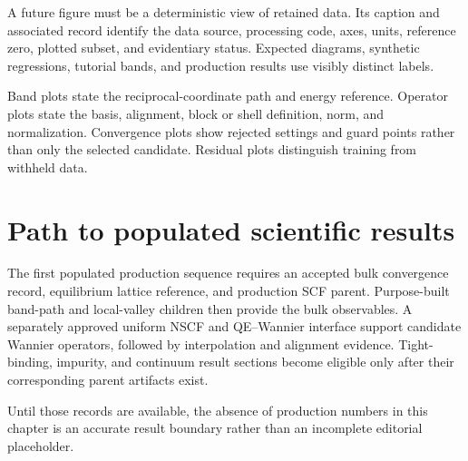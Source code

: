 A future figure must be a deterministic view of retained data. Its caption and
associated record identify the data source, processing code, axes, units,
reference zero, plotted subset, and evidentiary status. Expected diagrams,
synthetic regressions, tutorial bands, and production results use visibly
distinct labels.

Band plots state the reciprocal-coordinate path and energy reference. Operator
plots state the basis, alignment, block or shell definition, norm, and
normalization. Convergence plots show rejected settings and guard points rather
than only the selected candidate. Residual plots distinguish training from
withheld data.

\section{Path to populated scientific results}

The first populated production sequence requires an accepted bulk convergence
record, equilibrium lattice reference, and production SCF parent. Purpose-built
band-path and local-valley children then provide the bulk observables. A
separately approved uniform NSCF and QE--Wannier interface support candidate
Wannier operators, followed by interpolation and alignment evidence. Tight-
binding, impurity, and continuum result sections become eligible only after
their corresponding parent artifacts exist.

Until those records are available, the absence of production numbers in this
chapter is an accurate result boundary rather than an incomplete editorial
placeholder.
